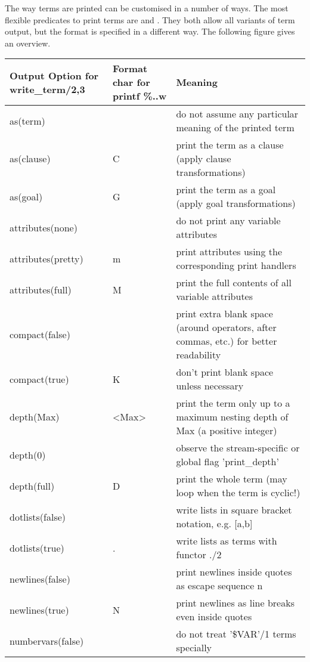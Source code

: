The way {\eclipse} terms are printed can be customised in a number of ways.
The most flexible predicates to print terms are
and
.
They both allow all variants of term output, but the format is
specified in a different way.
The following figure gives an overview.
\begin{center}
\begin{tabular}{|p{3.5cm}|p{1.5cm}|p{10cm}|}
\hline
Output Option for write_term/2,3 & Format char for printf \%..w & Meaning \\
\hline
\hline
as(term)		&   & do not assume any particular meaning of the printed term \\
\hline
as(clause)		& C & print the term as a clause (apply clause transformations) \\
\hline
as(goal)		& G & print the term as a goal (apply goal transformations) \\
\hline
attributes(none)	&   & do not print any variable attributes \\
\hline
attributes(pretty)	& m & print attributes using the corresponding print handlers \\
\hline
attributes(full)	& M & print the full contents of all variable attributes \\
\hline
compact(false)		&   & print extra blank space (around operators, after commas, etc.) for better readability \\
\hline
compact(true)		& K & don't print blank space unless necessary \\
\hline
depth(Max)		& <Max>  & print the term only up to a maximum nesting depth of Max (a positive integer) \\
\hline
depth(0)		&   & observe the stream-specific or global flag 'print_depth' \\
\hline
depth(full)		& D & print the whole term (may loop when the term is cyclic!) \\
\hline
dotlists(false)		&   & write lists in square bracket notation, e.g. [a,b] \\
\hline
dotlists(true)		& . & write lists as terms with functor ./2 \\
\hline
newlines(false)		&   & print newlines inside quotes as escape sequence {\bsl}n \\
\hline
newlines(true)		& N & print newlines as line breaks even inside quotes \\
\hline
numbervars(false)	&   & do not treat '\$VAR'/1 terms specially \\

\end{tabular}
\end{center}
